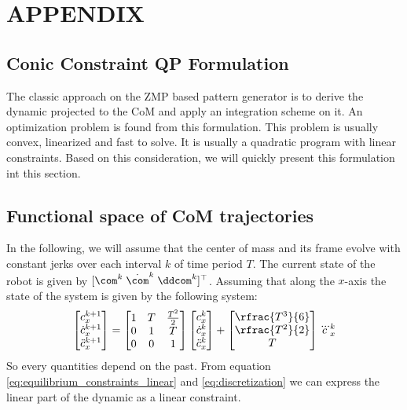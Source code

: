 \section*{APPENDIX}
\begin{appendix}
\section{Conic Constraint QP Formulation}
\label{sec:preview_window}
The classic approach on the ZMP based pattern generator is to derive the dynamic projected to the CoM and apply an integration scheme on it.
An optimization problem is found from this formulation.
This problem is usually convex, linearized and fast to solve.
It is usually a quadratic program with linear constraints.
Based on this consideration, we will quickly present this formulation int this section.

\subsection*{Functional space of CoM trajectories}
In the following, we will assume that the center of mass and its frame evolve with constant jerks over each interval $k$ of time period $T$.
The current state of the robot is given by $[\com^k \; \dot{\com}^k \; \ddcom^k ]^{\top}$.
Assuming that along the $x$-axis the state of the system is given by the
following system:
\begin{equation}
  \left[
  \begin{matrix}
    c^{k+1}_x \\
    \dot{c}^{k+1}_x \\
    \ddot{c}^{k+1}_x
  \end{matrix}
  \right]
  =
  \left[
  \begin{matrix}
    1 & T & \frac{T^2}{2} \\
    0 & 1 & T \\
    0 & 0 & 1
  \end{matrix}
  \right]
  \left[
  \begin{matrix}
    c^{k}_x \\
    \dot{c}^{k}_x \\
    \ddot{c}^{k}_x
  \end{matrix}
    \right]
  +
  \left[
  \begin{matrix}
    \rfrac{T^3}{6} \\
    \rfrac{T^2}{2} \\
    T
  \end{matrix}
  \right]
  \dddot{c}^k_x
  \label{eq:discretization}
\end{equation}
%
So every quantities depend on the past.
From equation \eqref{eq:equilibrium_constraints_linear} and \eqref{eq:discretization} we can express the linear part of the dynamic as a linear constraint.


\end{appendix}
